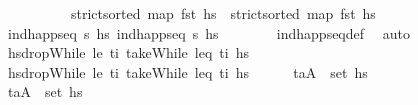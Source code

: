 \begin{isabellebody}
%
\isadelimproof
\ \ %
\endisadelimproof
%
\isatagproof
{}\isamarkupfalse%
\ {\isacharminus}{\kern0pt}\isanewline
\ \ \ \ \isamarkupfalse%
\ {\isachardoublequoteopen}strict{\isacharunderscore}{\kern0pt}sorted\ {\isacharparenleft}{\kern0pt}map\ fst\ hs\ \ {\isachardoublequoteopen}strict{\isacharunderscore}{\kern0pt}sorted\ {\isacharparenleft}{\kern0pt}map\ fst\ hs\isanewline
\ \ \ \ \ \ \isamarkupfalse%
\ {\isacartoucheopen}ind{\isacharunderscore}{\kern0pt}happ{\isacharunderscore}{\kern0pt}seq\ {\isasympi}s\ hs\ {\isacartoucheopen}ind{\isacharunderscore}{\kern0pt}happ{\isacharunderscore}{\kern0pt}seq\ {\isasympi}s\ hs\isanewline
\ \ \ \ \ \ \isamarkupfalse%
\ ind{\isacharunderscore}{\kern0pt}happ{\isacharunderscore}{\kern0pt}seq{\isacharunderscore}{\kern0pt}def\ \isamarkupfalse%
\ auto\isanewline
\ \ \ \ \isamarkupfalse%
\ {\isacharquery}{\kern0pt}hsdropWhile\ {\isacharparenleft}{\kern0pt}le\ t\isactrlsub i{\isacharparenright}{\kern0pt}\ {\isacharparenleft}{\kern0pt}takeWhile\ {\isacharparenleft}{\kern0pt}leq\ t\isactrlsub i{\isacharparenright}{\kern0pt}\ hs\isanewline
\ \ \ \ \isamarkupfalse%
\ {\isacharquery}{\kern0pt}hsdropWhile\ {\isacharparenleft}{\kern0pt}le\ t\isactrlsub i{\isacharparenright}{\kern0pt}\ {\isacharparenleft}{\kern0pt}takeWhile\ {\isacharparenleft}{\kern0pt}leq\ t\isactrlsub i{\isacharparenright}{\kern0pt}\ hs\isanewline
\ \ \ \ \isamarkupfalse%
\ {\isachardoublequoteopen}{\isacharparenleft}{\kern0pt}t\isactrlsub a{\isacharcomma}{\kern0pt}A{\isacharparenright}{\kern0pt}\ {\isasymin}\ set\ hs\isanewline
\ \ \ \ \ \ \isamarkupfalse%
\ {\isacartoucheopen}{\isacharparenleft}{\kern0pt}t\isactrlsub a{\isacharcomma}{\kern0pt}A{\isacharparenright}{\kern0pt}\ {\isasymin}\ set\ {\isacharquery}{\kern0pt}hs\ \isamarkupfalse%

\end{isabellebody}
